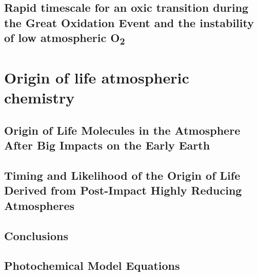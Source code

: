 \documentclass[11pt, proquest]{uwthesis}[2016/11/22]
\begin{document}
\chapter{Rapid timescale for an oxic transition during the Great Oxidation Event and the instability of low atmospheric O\textsubscript{2}}
\newpage


\part{Origin of life atmospheric chemistry} \label{pt:2}

\chapter{Origin of Life Molecules in the Atmosphere After Big Impacts on the Early Earth} \label{ch:5}
\newpage


\chapter{Timing and Likelihood of the Origin of Life Derived from Post-Impact Highly Reducing Atmospheres} \label{ch:6}
\newpage


\chapter{Conclusions}
\newpage


\printendnotes

%
%


%
%
\appendix
\raggedbottom\sloppy
 
 
\chapter{Photochemical Model Equations}
\newpage

 
\end{document}

